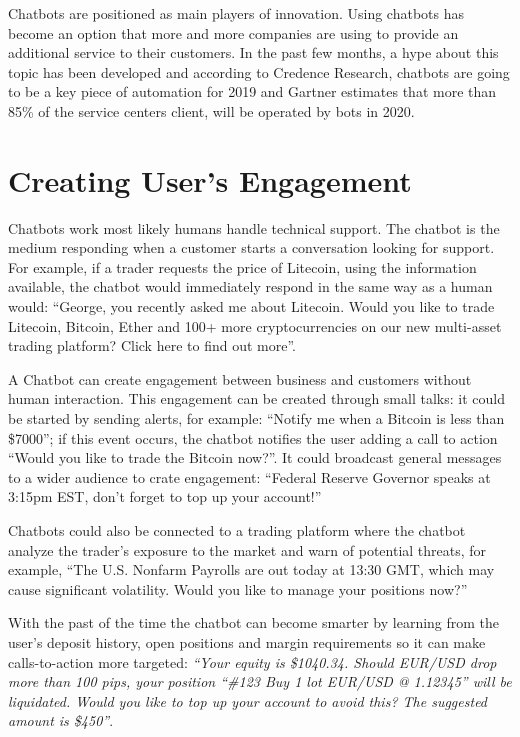 \documentclass[	DIV=calc,%
							paper=letter,%
							fontsize=12pt%
                            ]{scrartcl}	 					%
\begin{document}
Chatbots are positioned as main players of innovation. Using chatbots has become an option that more and more companies are using to provide an additional service to their customers. In the past few months, a hype about this topic has been developed and according to Credence Research, chatbots are going to be a key piece of automation for 2019 and Gartner estimates that more than 85\% of the service centers client, will be operated by bots in 2020.
\section{\label{sec:level1}Creating User’s Engagement}

Chatbots work most likely humans handle technical support. The chatbot is the medium responding when a customer starts a conversation looking for support. For example, if a trader requests the price of Litecoin, using the information available, the chatbot would immediately respond in the same way as a human would: “George, you recently asked me about Litecoin. Would you like to trade Litecoin, Bitcoin, Ether and 100+ more cryptocurrencies on our new multi-asset trading platform? Click here to find out more”.


A Chatbot can create engagement between business and customers without human interaction. This engagement can be created through small talks: it could be started by sending alerts, for example: “Notify me when a Bitcoin is less than \$7000”; if this event occurs, the chatbot notifies the user adding a call to action “Would you like to trade the Bitcoin now?”. It could broadcast general messages to a wider audience to crate engagement: “Federal Reserve Governor speaks at 3:15pm EST, don’t forget to top up your account!”
 
Chatbots could also be connected to a trading platform where the chatbot analyze the trader’s exposure to the market and warn of potential threats, for example, “The U.S. Nonfarm Payrolls are out today at 13:30 GMT, which may cause significant volatility. Would you like to manage your positions now?”
 
With the past of the time the chatbot can become smarter by learning from the user’s deposit history, open positions and margin requirements so it can make calls-to-action more targeted: \textit{“Your equity is \$1040.34. Should EUR/USD drop more than 100 pips, your position “\#123 Buy 1 lot EUR/USD @ 1.12345” will be liquidated. Would you like to top up your account to avoid this? The suggested amount is \$450”}.
\end{document}
